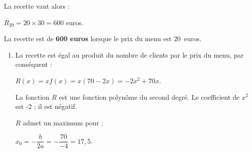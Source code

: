 \begin{corrige}
\begin{enumerate}
          \par
          La recette vaut alors :
          \par
          $R_{20}=20 \times 30 = 600$ euros.
          \par
          La recette est de \textbf{600 euros} lorsque le prix du menu est 20~euros.
          \par
     \end{enumerate}
     \par
     \par
     \begin{enumerate}
          \item %
          La recette est égal au produit du nombre de clients par le prix du menu, par conséquent :
          \par
          $R(x)=xf(x)=x(70-2x)$\nosp$=-2x^2+70x$.
          \par
          La fonction $R$ est une fonction polynôme du second degré. Le coefficient de $x^2$ est -2 ; il est négatif.
          \par
          $R$ admet un maximum pour :
          \par
          $x_0=-\dfrac{b}{2a}=-\dfrac{70}{-4}=17,5$.
          \par


\end{enumerate}
\end{corrige}
